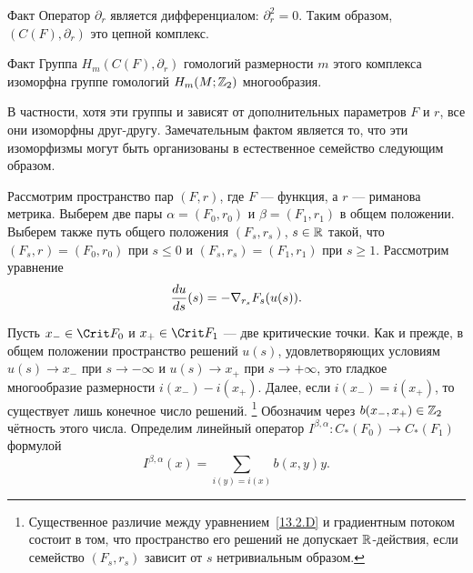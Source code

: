 \begin{thm}{Факт}\label{13.2.B}
  Оператор $\partial_{r}$ является дифференциалом: $\partial_{r}^{2}=0$.
  Таким образом, $(C(F),\partial_{r})$ это цепной комплекс. 
\end{thm}

\begin{thm}{Факт}\label{13.2.C}
  Группа $H_{m}(C(F),\partial_{r})$ гомологий размерности $m$ этого
  комплекса изоморфна группе гомологий $H_{m}(M; \mathbb{Z}_{2})$ многообразия.
\end{thm}

В частности, хотя эти группы и зависят от дополнительных параметров
$F$ и $r$, все они изоморфны друг-другу.
Замечательным фактом является то, что эти изоморфизмы могут быть
организованы в естественное семейство
следующим образом. 

Рассмотрим пространство пар $(F, r)$, где $F$ — функция, а $r$ —
риманова метрика. 
Выберем две пары $\alpha = (F_{0}, r_{0})$ и
$\beta = (F_{1},r_{1})$ в общем положении.
Выберем также путь общего положения
$(F_{s},r_{s})$, $s\in\mathbb{R}$ такой, что
$(F_{s}, r_{}) = (F_{0}, r_{0})$ при $s\le0$ и
$(F_{s}, r_{s}) = (F_{1},r_{1})$ при $s\ge1$.
Рассмотрим уравнение
\begin{equation}\label{13.2.D}
\frac{d u}{d s}(s)=-\nabla_{r_{s}}F_{s}(u(s)).
\end{equation}

Пусть $x_{-}\in\Crit F_{0}$ и $x_{+}\in\Crit F_{1}$ — две критические точки.
Как и прежде, в общем положении пространство решений $u(s)$,
удовлетворяющих условиям $u(s)\to x_{-}$ при $s\to-\infty$ и $u(s)\to
x_{+}$ при  $s\to+\infty$, это гладкое многообразие размерности
$i(x_{-})-i(x_{+})$.
Далее, если $i(x_{-}) = i(x_{+})$, то существует лишь конечное число
решений.%
\footnote{Существенное различие между уравнением~\ref{13.2.D} и
  градиентным потоком состоит в том, что пространство его решений
  не допускает $\mathbb{R}$-действия, если семейство $(F_{s},r_{s})$ зависит
  от $s$ нетривиальным образом.}
Обозначим через $b(x_{-},x_{+})\in\mathbb{Z}_{2}$ чётность этого числа.
Определим линейный оператор
$I^{\beta,\alpha} : C_{*}(F_{0})\to C_{*}(F_{1})$ формулой
\[
I^{\beta,\alpha}(x) = \sum_{i(y)=i(x)}b(x, y)y.
\]

